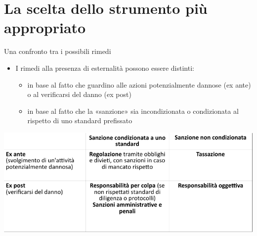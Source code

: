 \documentclass[aspectratio=64,11pt]{beamer}
\begin{document}
\section{La scelta dello strumento più appropriato}


\begin{frame}{Una confronto tra i possibili rimedi}
\begin{itemize}
\item I rimedi alla presenza di esternalità possono essere distinti:
\begin{itemize}
\item in base al fatto che guardino alle azioni potenzialmente dannose (ex ante) o
al verificarsi del danno (ex post)
\item in base al fatto che la «sanzione» sia incondizionata o condizionata al
rispetto di uno standard prefissato
\end{itemize}
\end{itemize}

\begin{center}
\includegraphics[width=.9\linewidth]{./figure/esternalita-comparazione-rimedi.pdf}
\end{center}
\end{frame}
\end{document}
